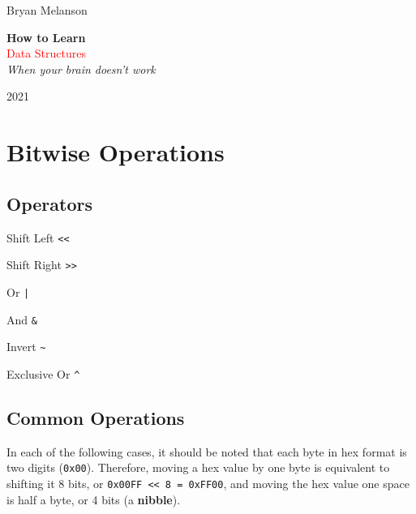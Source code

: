 \documentclass[11pt]{article}
\newcommand*{\plogo}{\fbox{$\mathcal{BM}$}}
\begin{document}
 

\begin{titlepage}

\raggedleft

\vspace*{\baselineskip}

{\Large Bryan Melanson}

\vspace*{0.167\textheight}

\textbf{\LARGE How to Learn}\\[\baselineskip]

{\textcolor{Red}{\Huge Data Structures}}\\[\baselineskip]

{\Large \textit{When your brain doesn't work}}

\vfill

{\large 2021 ~~\plogo}

\vspace*{3\baselineskip}

\end{titlepage}

\pagebreak
\tableofcontents
\pagebreak
\section{Bitwise Operations}
\subsection{Operators}
\begin{list}{}{}
    \item Shift Left \texttt{<<}
    \item Shift Right \texttt{>>}
    \item Or \texttt{|}
    \item And \texttt{\&}
    \item Invert \texttt{\textasciitilde}
    \item Exclusive Or \texttt{\textasciicircum}
\end{list}
\subsection{Common Operations}
In each of the following cases, it should be noted that each byte in hex format is two digits (\texttt{0x00}). Therefore, moving a hex value by one byte is equivalent to shifting it 8 bits, or \texttt{0x00FF << 8 = 0xFF00}, and moving the hex value one space is half a byte, or 4 bits (a \textbf{nibble}). 
\end{document}
